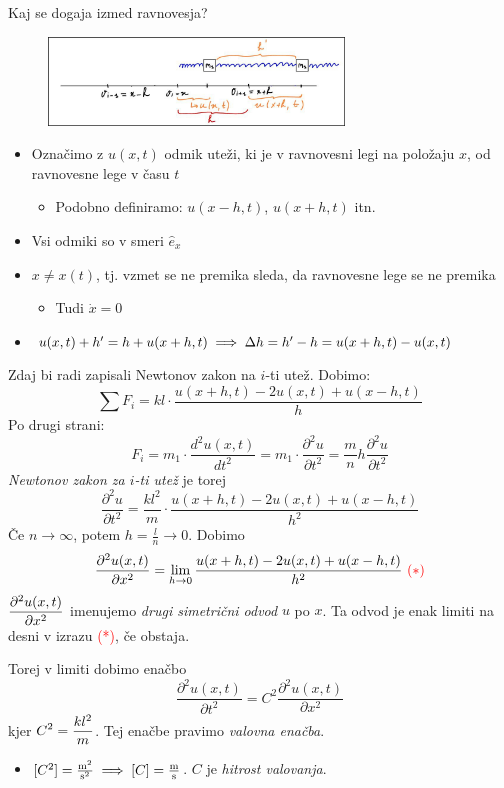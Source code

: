 Kaj se dogaja izmed ravnovesja?
\begin{figure}[h!]
    \centering
    \includegraphics[width=0.7\textwidth]{img/01_009.jpg}  
\end{figure}
\begin{itemize}
    \item Označimo z \(u(x, t)\) odmik uteži, ki je v ravnovesni legi na položaju \(x\), od ravnovesne lege v času \(t\)
    \begin{itemize}
        \item Podobno definiramo: \(u(x - h, t)\), \(u(x + h, t)\) itn.
    \end{itemize}
    \item Vsi odmiki so v smeri \(\hat{e}_x\)
    \item \(x \neq x(t)\), tj. vzmet se ne premika sleda, da ravnovesne lege se ne premika
    \begin{itemize}
        \item Tudi \(\dot{x} = 0\)
    \end{itemize}
    \item \(u(x, t) + h' = h + u(x+h, t) \implies \Delta h = h' - h  = u(x + h, t) - u(x, t)\)
\end{itemize}
%
Zdaj bi radi zapisali Newtonov zakon na \(i\)-ti utež. Dobimo:
\[
\sum F_i = kl \cdot  \frac{u(x+h, t) - 2u(x, t) + u(x -h, t)}{h}
\]
%
Po drugi strani:
\[
F_i = m_1 \cdot \frac{d^2u(x, t)}{dt^2} = m_1 \cdot \frac{\partial^2 u}{\partial t^2} = \frac{m}{n}h \frac{\partial^2 u}{\partial t^2}
\]
%
\emph{Newtonov zakon za \(i\)-ti utež} je torej
%
\[
    \frac{\partial^2 u}{\partial t^2} = \frac{kl^2}{m} \cdot \frac{u(x+h, t) - 2u(x, t) + u(x -h, t)}{h^2}
\]
\newpage
%
Če \(n \to \infty\), potem \(h = \frac{l}{n} \to 0\). Dobimo 
%
\[
\frac{\partial^2u(x,t)}{\partial x^2} = \lim_{h \to 0} \frac{u(x+h, t) - 2u(x, t) + u(x -h, t)}{h^2} \ \textcolor{red}{(*)}
\]
%
\(\displaystyle \frac{\partial^2u(x,t)}{\partial x^2}\) imenujemo \emph{drugi simetrični odvod} \(u\) po \(x\). Ta odvod je enak limiti na desni v izrazu \textcolor{red}{(*)}, če obstaja.

Torej v limiti dobimo enačbo
%
\[
    \boxed{\frac{\partial^2 u(x, t)}{\partial t^2} = C^2 \frac{\partial^2u(x,t)}{\partial x^2}}
\]
%
kjer \(\displaystyle C^2 = \frac{kl^2}{m}\). Tej enačbe pravimo \emph{valovna enačba}.
\begin{itemize}
    \item \([C^2] = \frac{\text{m}^2}{\text{s}^2} \implies [C] = \frac{\text{m}}{\text{s}}\). \(C\) je \emph{hitrost valovanja}.
\end{itemize}


